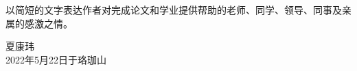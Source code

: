 
\Acknowledgements


以简短的文字表达作者对完成论文和学业提供帮助的老师、同学、领导、同事及亲属的感激之情。


\begin{signature}
  夏康玮 \\
  2022年5月22日于珞珈山
\end{signature}
